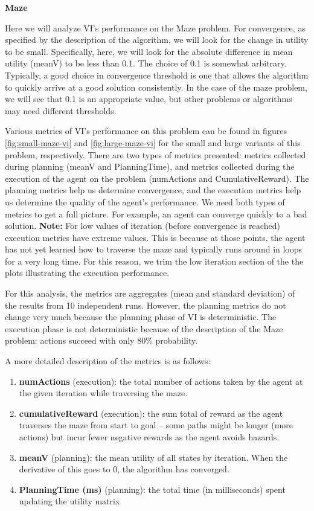\documentclass{article}
\begin{document}
\textbf{Maze}

Here we will analyze VI's performance on the Maze problem. For convergence, as specified by the
description of the algorithm, we will look for the change in utility to be small. Specifically,
here, we will look for the absolute difference in mean utility (meanV) to be less than 0.1. The
choice of 0.1 is somewhat arbitrary. Typically, a good choice in convergence threshold is one
that allows the algorithm to quickly arrive at a good solution consistently. In the case of the
maze problem, we will see that 0.1 is an appropriate value, but other problems or algorithms
may need different thresholds.

Various metrics of VI's performance on this problem can be found in figures \ref{fig:small-maze-vi}
and \ref{fig:large-maze-vi} for the small and large variants of this problem, respectively. There
are two types of metrics presented: metrics collected during planning (meanV and PlanningTime),
and metrics collected during the execution of the agent on the problem (numActions and
CumulativeReward). The planning metrics help us determine convergence, and the execution metrics help
us determine the quality of the agent's performance. We need both types of metrics to get a full
picture. For example, an agent can converge quickly to a bad solution. \textbf{Note:} For low
values of iteration (before convergence is reached) execution metrics have extreme values. This is
because at those points, the agent has not yet learned how to traverse the maze and typically
runs around in loops for a very long time. For this reason, we trim the low iteration section of the
the plots illustrating the execution performance.

For this analysis, the metrics are aggregates (mean and standard deviation) of the results from
10 independent runs. However, the planning metrics do not change very much because the planning
phase of VI is deterministic. The execution phase is not deterministic because of the description
of the Maze problem: actions succeed with only 80\% probability.

A more detailed description of the metrics is as follows: 

\begin{enumerate}
    \item \textbf{numActions} (execution): the total number of actions taken by the agent at the
    given iteration while traversing the maze.
    \item \textbf{cumulativeReward} (execution): the sum total of reward as the agent traverses the
    maze from start to goal -- some paths might be longer (more actions) but incur fewer negative 
    rewards as the agent avoids hazards.
    \item \textbf{meanV} (planning): the mean utility of all states by iteration. When the derivative
    of this goes to 0, the algorithm has converged.
    \item \textbf{PlanningTime (ms)} (planning): the total time (in milliseconds) spent updating the
    utility matrix
\end{enumerate}
\end{document}
